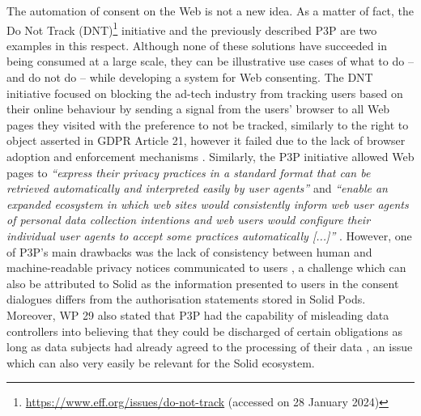 The automation of consent on the Web is not a new idea.
As a matter of fact, the Do Not Track (DNT)\footnote{\url{https://www.eff.org/issues/do-not-track} (accessed on 28 January 2024)} initiative and the previously described P3P are two examples in this respect.
Although none of these solutions have succeeded in being consumed at a large scale, they can be illustrative use cases of what to do -- and do not do -- while developing a system for Web consenting. 
The DNT initiative focused on blocking the ad-tech industry from tracking users based on their online behaviour by sending a signal from the users' browser to all Web pages they visited with the preference to not be tracked, similarly to the right to object asserted in GDPR Article 21, however it failed due to the lack of browser adoption and enforcement mechanisms \citep{kamara_not_2016}.
Similarly, the P3P initiative allowed Web pages to \textit{``express their privacy practices in a standard format that can be retrieved automatically and interpreted easily by user agents''} and \textit{``enable an expanded ecosystem in which web sites would consistently inform web user agents of personal data collection intentions and web users would configure their individual user agents to accept some practices automatically [...]''} \citep{cranor_platform_2002}.
However, one of P3P's main drawbacks was the lack of consistency between human and machine-readable privacy notices communicated to users \citep{cranor_web_2002}, a challenge which can also be attributed to Solid as the information presented to users in the consent dialogues differs from the authorisation statements stored in Solid Pods.
Moreover, WP 29 also stated that P3P had the capability of misleading data controllers into believing that they could be discharged of certain obligations as long as data subjects had already agreed to the processing of their data \citep{article_29_data_protection_working_party_article_2014}, an issue which can also very easily be relevant for the Solid ecosystem.

